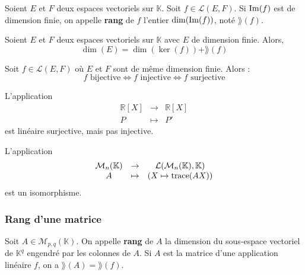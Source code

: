 
	\begin{definition}
		Soient $E$ et $F$ deux espaces vectoriels sur $\mathbb{K}$. Soit $f \in \mathcal{L}(E, F)$. Si $\mathrm{Im}(f)$ est de dimension finie, on appelle \textbf{rang} de $f$ l'entier $\dim(\mathrm{Im}(f))$, noté $\rang (f)$.
	\end{definition}

	\begin{theorem}
		Soient $E$ et $F$ deux espaces vectoriels sur $\mathbb{K}$ avec $E$ de dimension finie. Alors,
		\[ \dim(E) = \dim(\ker (f)) + \rang (f) \]
	\end{theorem}

	\begin{corollary}
		Soit $f \in \mathcal{L}(E, F)$ où $E$ et $F$ sont de même dimension finie. Alors :
		\[ f \text{ bijective} \iff f \text{ injective} \iff f \text{ surjective} \]
	\end{corollary}

	\begin{cexample}
		L'application
		\[
		\begin{array}{ccc}
			\mathbb{R}[X] &\rightarrow& \mathbb{R}[X] \\
			P &\mapsto& P'
		\end{array}
		\]
		est linéaire surjective, mais pas injective.
	\end{cexample}


	\begin{application}
		L'application
		\[
		\begin{array}{ccc}
			\mathcal{M}_n(\mathbb{K}) &\rightarrow& \mathcal{L}(\mathcal{M}_n(\mathbb{K}), \mathbb{K}) \\
			A &\mapsto& (X \mapsto \operatorname{trace}(AX))
		\end{array}
		\]
		est un isomorphisme.
	\end{application}

	\subsubsection{Rang d'une matrice}


	\begin{definition}
		Soit $A \in \mathcal{M}_{p,q}(\mathbb{K})$. On appelle \textbf{rang} de $A$ la dimension du sous-espace vectoriel de $\mathbb{K}^q$ engendré par les colonnes de $A$. Si $A$ est la matrice d'une application linéaire $f$, on a $\rang (A) = \rang (f)$.
	\end{definition}

